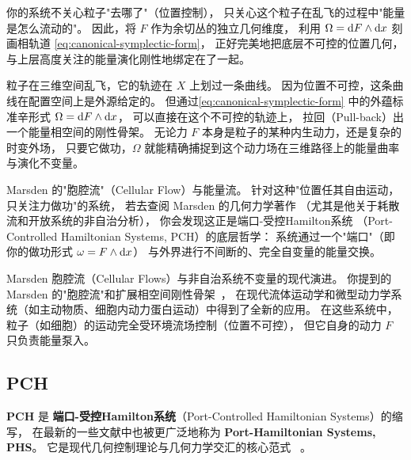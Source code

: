 ﻿\documentclass[10pt,a4paper]{article}
\numberwithin{equation}{section}
\begin{document}
你的系统不关心粒子"去哪了"（位置控制），
只关心这个粒子在乱飞的过程中"能量是怎么流动的"。
因此，将 $F$ 作为余切丛的独立几何维度，
利用 $\Omega = \text dF \wedge \text dx$ 刻画相轨道
\eqref{eq:canonical-symplectic-form}，
正好完美地把底层不可控的位置几何，
与上层高度关注的能量演化刚性地绑定在了一起。

粒子在三维空间乱飞，它的轨迹在 $X$ 上划过一条曲线。
因为位置不可控，这条曲线在配置空间上是外源给定的。
但通过\eqref{eq:canonical-symplectic-form}
中的外蕴标准辛形式
$\Omega = \text dF \wedge \text dx$，
可以直接在这个不可控的轨迹上，
拉回（Pull-back）出一个能量相空间的刚性骨架。
无论力 $F$ 本身是粒子的某种内生动力，还是复杂的时变外场，
只要它做功，$\Omega$ 就能精确捕捉到这个动力场在三维路径上的能量曲率与演化不变量。

Marsden 的"胞腔流"（Cellular Flow）与能量流。
  针对这种"位置任其自由运动，只关注力做功"的系统，
  若去查阅 Marsden 的几何力学著作
  （尤其是他关于耗散流和开放系统的非自治分析），
  你会发现这正是端口-受控Hamilton系统
  （Port-Controlled Hamiltonian Systems, PCH）的底层哲学：
  系统通过一个"端口"（即你的做功形式 $\omega = F \wedge \text dx$）
  与外界进行不间断的、完全自变量的能量交换。


Marsden 胞腔流（Cellular Flows）与非自治系统不变量的现代演进。
你提到的 Marsden 的"胞腔流"和扩展相空间刚性骨架~\cite{MarsdenRatiu1994}，
在现代流体运动学和微型动力学系统（如主动物质、细胞内动力蛋白运动）中得到了全新的应用。
在这些系统中，粒子（如细胞）的运动完全受环境流场控制（位置不可控），
但它自身的动力 $F$ 只负责能量泵入。  

\subsection{PCH}


\textbf{PCH} 是 \textbf{端口-受控Hamilton系统}（Port-Controlled Hamiltonian Systems）的缩写，
在最新的一些文献中也被更广泛地称为 \textbf{Port-Hamiltonian Systems, PHS}。
它是现代几何控制理论与几何力学交汇的核心范式
~\cite{MaschkeVanDerSchaft1992,VanDerSchaftJeltsema2014}。
\end{document}
